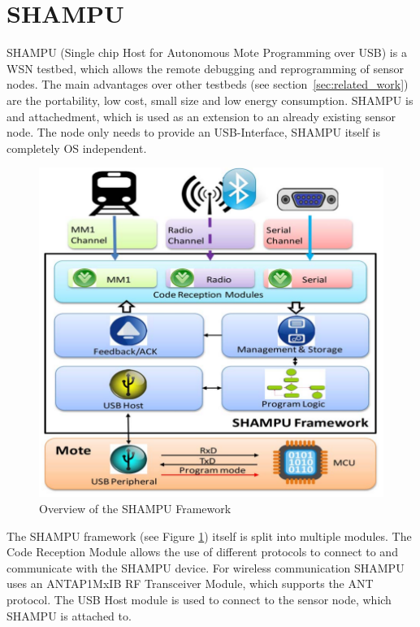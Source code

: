 \section{SHAMPU}
SHAMPU (Single chip Host for Autonomous Mote Programming over USB) \cite{Smeets:2014:DAL:2602339.2602401} is a WSN testbed, which allows the remote debugging and reprogramming of sensor nodes. The main advantages over other testbeds (see section~\ref{sec:related_work}) are the portability, low cost, small size and low energy consumption. SHAMPU is and attachedment, which is used as an extension to an already existing sensor node. The node only needs to provide an USB-Interface, SHAMPU itself is completely OS independent.
\begin{figure}[h]
\centering
\includegraphics[scale=.5]{./pics/SHAMPUframework.png}
\caption{Overview of the SHAMPU Framework}\label{fig:shampuframework}
\end{figure}
The SHAMPU framework (see Figure \ref{fig:shampuframework}) itself is split into multiple modules. The Code Reception Module allows the use of different protocols to connect to and communicate with the SHAMPU device. For wireless communication SHAMPU uses an ANTAP1MxIB RF Transceiver Module, which supports the ANT protocol. The USB Host module is used to connect to the sensor node, which SHAMPU is attached to.

